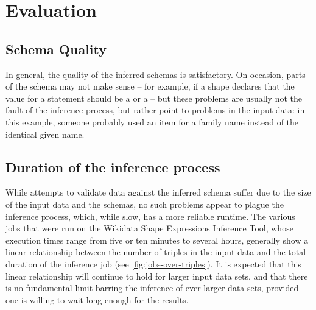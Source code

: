 
\chapter{Evaluation}
\label{ch:Evaluation}


\section{Schema Quality}
\label{sec:Evaluation:quality}

In general, the quality of the inferred schemas is satisfactory.
On occasion, parts of the schema may not make sense –
for example, if a shape declares that the value for a  statement
should be a  or a  –
but these problems are usually not the fault of the inference process,
but rather point to problems in the input data:
in this example, someone probably used an item for a family name
instead of the identical given name. %

\section{Duration of the inference process}
\label{sec:Evaluation:duration}

While attempts to validate data against the inferred schema
suffer due to the size of the input data and the schemas,
no such problems appear to plague the inference process,
which, while slow, has a more reliable runtime.
The various jobs that were run on the Wikidata Shape Expressions Inference Tool,
whose execution times range from five or ten minutes to several hours,
generally show a linear relationship between the number of triples in the input data
and the total duration of the inference job
(see \cref{fig:jobs-over-triples}).
It is expected that this linear relationship will continue to hold for larger input data sets,
and that there is no fundamental limit barring the inference of ever larger data sets,
provided one is willing to wait long enough for the results.

